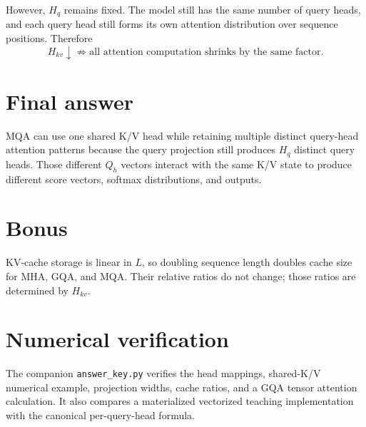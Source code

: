 \documentclass[11pt]{article}
\begin{document}
However, $H_q$ remains fixed. The model still has the same number of query heads, and each query head still forms its own attention distribution over sequence positions. Therefore
\[
\boxed{
H_{kv}\downarrow
\not\Rightarrow
\text{all attention computation shrinks by the same factor}
}.
\]

\section*{Final answer}

MQA can use one shared K/V head while retaining multiple distinct query-head attention patterns because the query projection still produces $H_q$ distinct query heads. Those different $Q_h$ vectors interact with the same K/V state to produce different score vectors, softmax distributions, and outputs.

\section*{Bonus}

KV-cache storage is linear in $L$, so doubling sequence length doubles cache size for MHA, GQA, and MQA. Their relative ratios do not change; those ratios are determined by $H_{kv}$.

\section*{Numerical verification}

The companion \texttt{answer\_key.py} verifies the head mappings, shared-K/V numerical example, projection widths, cache ratios, and a GQA tensor attention calculation. It also compares a materialized vectorized teaching implementation with the canonical per-query-head formula.
\end{document}
